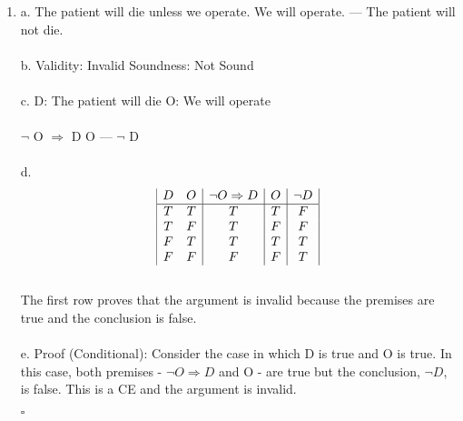 \documentclass[]{article}
\begin{document}
\begin{enumerate}
    \item a.
    \newline The patient will die unless we operate.
    \newline
    We will operate.
    \newline
    ---
    \newline
    The patient will not die.
    \\\\b.
    Validity: Invalid
    \newline
    Soundness: Not Sound
    \\\\c.
    \newline D: The patient will die
    \newline O: We will operate
    \\\\ $\neg$ O $\Rightarrow$ D
    \newline O
    \newline ---
    \newline $\neg$ D
    \\\\d.
    \begin{displaymath}
    \begin{array}{|c c|c|c|c|}
    D & O & \neg O \Rightarrow D & O & \neg D\\ %
    \hline %
    T & T & T & T & F\\
    T & F & T & F & F\\
    F & T & T & T & T\\
    F & F & F & F & T\\
    \end{array}
    \end{displaymath}
    \\The first row proves that the argument is invalid because the premises are true and the conclusion is false.
    \\\\e.
    \newline Proof (Conditional):
    \newline Consider the case in which D is true and O is true.  In this case, both premises - $\neg O \Rightarrow D$ and O - are true but the conclusion, $\neg D$, is false. This is a CE and the argument is invalid.
    \begin{flushright}
    $\square$
    \end{flushright}
    

\end{enumerate}
\end{document}

